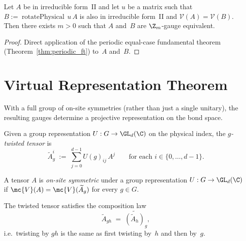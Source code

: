 \begin{corollary}%
    \label{cor:symmetry_periodic_assembly}
    \leanok
    Let $A$ be in irreducible form~II and let $u$ be a matrix such that
    $B := \operatorname{rotatePhysical}\, u\, A$ is also in irreducible
    form~II and $\mathcal{V}(A) = \mathcal{V}(B)$.
    Then there exists $m > 0$ such that $A$ and~$B$ are
    $\Z_m$-gauge equivalent.
\end{corollary}

\begin{proof}\leanok
    Direct application of the periodic equal-case fundamental theorem
    (Theorem~\ref{thm:periodic_ft}) to~$A$ and~$B$.
\end{proof}

\section{Virtual Representation Theorem}

With a full group of on-site symmetries (rather than just a single
unitary), the resulting gauges determine a projective representation
on the bond space.

\begin{definition}\label{def:twisted_tensor}
    \leanok
    Given a group representation $U : G \to \GL_d(\C)$ on the physical
    index, the \emph{$g$-twisted tensor} is
    \[
        \widetilde{A}_g^i \;:=\; \sum_{j=0}^{d-1} U(g)_{ij}\, A^j
        \qquad \text{for each } i \in \{0,\ldots,d{-}1\}.
    \]
\end{definition}

\begin{definition}\label{def:on_site_symmetric}
    \leanok
    A tensor $A$ is \emph{on-site symmetric} under a group
    representation $U : G \to \GL_d(\C)$ if $\mc{V}(A) = \mc{V}(\widetilde{A}_g)$
    for every $g \in G$.
\end{definition}

\begin{lemma}\label{lem:twisted_tensor_mul}
    \leanok
    The twisted tensor satisfies the composition law
    \[
        \widetilde{A}_{gh} \;=\; \widetilde{(\widetilde{A}_h)}_g,
    \]
    i.e.\ twisting by $gh$ is the same as first twisting by~$h$
    and then by~$g$.
\end{lemma}

